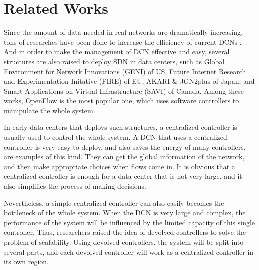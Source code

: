 

\chapter{Related Works}
\label{chap:related}

Since the amount of data needed in real networks are dramatically increasing, tons of researches have been done to increase the efficiency of current DCNs \cite{dcnarch,hedera,spain,vl2,elastictree,flyways}. And in order to make the management of DCN effective and easy, several structures are also raised to deploy SDN in data centers, such as Global Environment for Network Innovations (GENI) of US, Future Internet Research and Experimentation Initative (FIRE) of EU, AKARI \& JGN2plus of Japan, and Smart Applications on Virtual Infrastructure (SAVI) of Canada. Among these works, OpenFlow is the most popular one, which uses software controllers to manipulate the whole system.

In early data centers that deploys such structures, a centralized controller is usually used to control the whole system. A DCN that uses a centralized controller is very easy to deploy, and also saves the energy of many controllers. \cite{hedera,spain,openflow,elastictree} are examples of this kind. They can get the global information of the network, and then make appropriate choices when flows come in. It is obvious that a centralized controller is enough for a data center that is not very large, and it also simplifies the process of making decisions.

Nevertheless, a simple centralized controller can also easily becomes the bottleneck of the whole system. When the DCN is very large and complex, the performance of the system will be influenced by the limited capacity of this single controller. Thus, researchers raised the idea of devolved controllers \cite{devolved,devolvedglobecom,elasticsdn,hyperflow,inpacket,multictr} to solve the problem of scalability. Using devolved controllers, the system will be split into several parts, and each devolved controller will work as a centralized controller in its own region.

